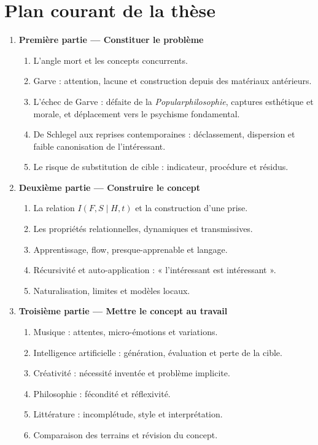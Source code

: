 \documentclass[11pt,a4paper]{article}
\begin{document}
\section{Plan courant de la thèse}

\begin{enumerate}
  \item \textbf{Première partie --- Constituer le problème}
    \begin{enumerate}
      \item L'angle mort et les concepts concurrents.
      \item Garve : attention, lacune et construction depuis des matériaux
            antérieurs.
      \item L'échec de Garve : défaite de la \emph{Popularphilosophie}, captures
            esthétique et morale, et déplacement vers le psychisme fondamental.
      \item De Schlegel aux reprises contemporaines : déclassement, dispersion
            et faible canonisation de l'intéressant.
      \item Le risque de substitution de cible : indicateur, procédure et résidus.
    \end{enumerate}
  \item \textbf{Deuxième partie --- Construire le concept}
    \begin{enumerate}
      \item La relation \(I(F,S\mid H,t)\) et la construction d'une prise.
      \item Les propriétés relationnelles, dynamiques et transmissives.
      \item Apprentissage, flow, presque-apprenable et langage.
      \item Récursivité et auto-application : « l'intéressant est intéressant ».
      \item Naturalisation, limites et modèles locaux.
    \end{enumerate}
  \item \textbf{Troisième partie --- Mettre le concept au travail}
    \begin{enumerate}
      \item Musique : attentes, micro-émotions et variations.
      \item Intelligence artificielle : génération, évaluation et perte de la
            cible.
      \item Créativité : nécessité inventée et problème implicite.
      \item Philosophie : fécondité et réflexivité.
      \item Littérature : incomplétude, style et interprétation.
      \item Comparaison des terrains et révision du concept.
    \end{enumerate}
\end{enumerate}
\end{document}
